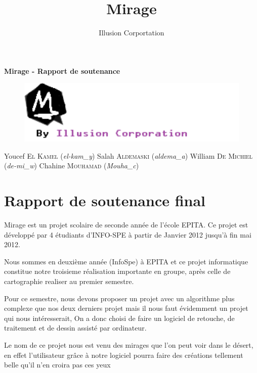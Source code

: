 \documentclass[12pt, a4paper]{report}
\title{Mirage}
\author{Illusion Corportation}
\date{}
\begin{document}
\thispagestyle{empty}
\begin{center}
\fontsize{16}{20pt}
\textbf{Mirage - Rapport de soutenance}
\end{center}
\vspace*{1.9cm}


\begin{figure}[!h]
\begin{center} \includegraphics[width=1.3\textwidth]{images/mirage_logo.png} \end{center}
\end{figure}

\vspace*{7.8cm}
\par
\begin{flushleft}
\fontsize{16}{21pt}
Youcef \textsc{El Kamel}
(\emph{el-kam\_y})
\newline
Salah \textsc{Aldemaski}
(\emph{aldema\_a})
\newline
William \textsc{De Michiel}
(\emph{de-mi\_w})
\newline
Chahine \textsc{Mouhamad}
(\emph{Mouha\_c})

\end{flushleft}


\newpage


\tableofcontents


\chapter{Rapport de soutenance final}


Mirage est un projet scolaire de seconde ann\'ee de l'\'ecole EPITA. Ce projet est d\' evelopp\'e par 4 \' etudiants d'INFO-SPE \`a partir de Janvier 2012 jusqu'\`a fin mai 2012. 
\par Nous sommes en deuxi\`eme ann\' ee (InfoSpe) \`a EPITA et ce projet informatique constitue notre troisieme r\' ealisation importante en groupe, apr\`es celle de cartographie realiser au premier semestre. 
\par Pour ce semestre, nous devons proposer un projet avec un algorithme plus complexe que nos deux derniers projet mais il nous faut évidemment  un projet qui nous intéresserait, On a donc choisi de faire un logiciel de retouche, de traitement et de dessin assisté par ordinateur.
\par Le nom de ce projet nous est venu des mirages que l'on peut voir dans le désert, en effet l'utilisateur grâce à notre logiciel pourra faire des créations tellement belle qu'il n'en croira pas ces yeux
\end{document}
